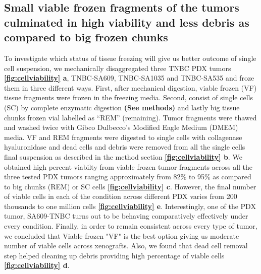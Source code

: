 

\subsection{Small viable frozen fragments of the tumors culminated in high viability and less debris as compared to big frozen chunks}
To investigate which status of tissue freezing will give us better outcome of single cell suspension, we mechanically disaggregated three TNBC PDX tumors \textbf{\autoref{fig:cellviability} a}, TNBC-SA609, TNBC-SA1035 and TNBC-SA535 and froze them in three different ways. First, after mechanical digestion, viable frozen (VF) tissue fragments were frozen in the freezing media. Second, consist of single cells (SC) by complete enzymatic digestion \textbf{(See methods)} and lastly big tissue chunks frozen vial labelled as ``REM'' (remaining). 
Tumor fragments were thawed and washed twice with 
Gibco Dulbecco's Modified Eagle Medium (DMEM) media. VF and REM fragments were digested to single cells with collagenase hyaluronidase and dead cells and debris were removed from all the single cells final suspension as described in the method section \textbf{\autoref{fig:cellviability} b}. We obtained high percent viabilty from viable frozen tumor fragments across all the three tested PDX tumors ranging approximately from 82\% to 95\% as compared to big chunks (REM) or SC cells \textbf{\autoref{fig:cellviability} c}.
However, the final number of viable cells in each of the condition across different PDX varies from 200 thousands to one million cells \textbf{\autoref{fig:cellviability} e}. Interestingly, one of the PDX tumor, SA609-TNBC turns out to be behaving comparatively effectively under every condition. 
Finally, in order to  remain consistent across every type of tumor, we concluded that Viable frozen "VF" is the best option giving us moderate number of viable cells across xenografts.
Also, we found that dead cell removal step helped cleaning up debris providing high percentage of viable cells \textbf{\autoref{fig:cellviability} d}.





